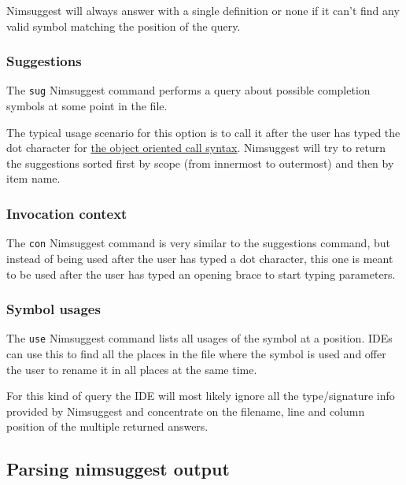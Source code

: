 Nimsuggest will always answer with a single definition or none if it
can't find any valid symbol matching the position of the query.

\hypertarget{suggestions}{%
\subsubsection{Suggestions}\label{suggestions}}

The \texttt{sug} Nimsuggest command performs a query about possible
completion symbols at some point in the file.

The typical usage scenario for this option is to call it after the user
has typed the dot character for
\href{tut2.html\#object-oriented-programming-method-call-syntax}{the
object oriented call syntax}. Nimsuggest will try to return the
suggestions sorted first by scope (from innermost to outermost) and then
by item name.

\hypertarget{invocation-context}{%
\subsubsection{Invocation context}\label{invocation-context}}

The \texttt{con} Nimsuggest command is very similar to the suggestions
command, but instead of being used after the user has typed a dot
character, this one is meant to be used after the user has typed an
opening brace to start typing parameters.

\hypertarget{symbol-usages}{%
\subsubsection{Symbol usages}\label{symbol-usages}}

The \texttt{use} Nimsuggest command lists all usages of the symbol at a
position. IDEs can use this to find all the places in the file where the
symbol is used and offer the user to rename it in all places at the same
time.

For this kind of query the IDE will most likely ignore all the
type/signature info provided by Nimsuggest and concentrate on the
filename, line and column position of the multiple returned answers.

\hypertarget{parsing-nimsuggest-output}{%
\subsection{Parsing nimsuggest output}\label{parsing-nimsuggest-output}}

